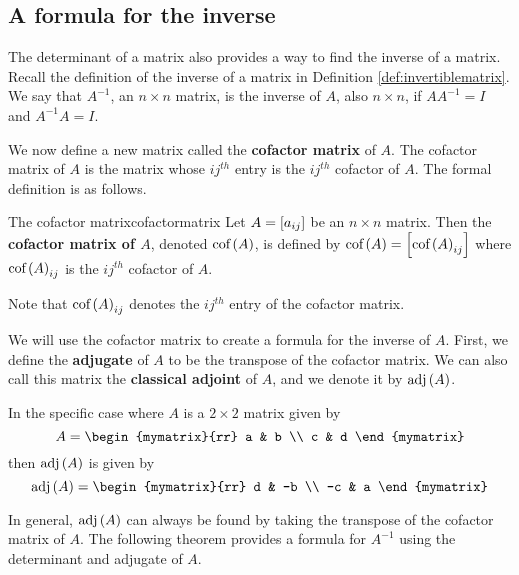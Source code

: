\subsection{A formula for the inverse}

The determinant of a matrix also provides a way to find the inverse of a matrix.
Recall the definition of the inverse of a matrix in Definition \ref{def:invertiblematrix}.
We say that $A^{-1}$, an $n \times n$ matrix, is the inverse of $A$, also $n \times n$, if $AA^{-1} = I$ and $A^{-1}A=I$. 

We now define a new matrix called the \textbf{cofactor matrix} of $A$.  
The cofactor matrix of $A$ is the matrix whose $ij^{th}$ entry is the $ij^{th}$ cofactor of $A$.
The formal definition is as follows.

\begin{definition}{The cofactor matrix}{cofactormatrix}
Let $A=\left[ a_{ij}\right]$ be an $n\times n$ matrix. Then the
\textbf{cofactor matrix of $A$}, denoted 
$\mbox{cof}\left( A\right)$, is defined by $\mbox{cof}\left( A\right) =\left[
\mbox{cof}\left(A\right)_{ij}\right] $ where  $\mbox{cof}\left(A\right)_{ij}$ is the $ij^{th}$ cofactor of $A$.
\end{definition}

Note that $\mbox{cof}\left(A\right)_{ij}$ denotes the $ij^{th}$ entry of the cofactor matrix.

We will use the cofactor matrix to create a formula for the inverse of $A$. First,
we define the \textbf{adjugate} of $A$ to be the transpose of 
the cofactor matrix. We can also call this matrix the \textbf{classical adjoint} of $A$,
and we denote it by $\mbox{adj} \left(A\right)$. 

In the specific case where $A$ is a $2 \times 2$ matrix given by
\begin{equation*}
A = \begin{mymatrix}{rr}
a & b \\
c & d
\end{mymatrix}
\end{equation*}
then $\mbox{adj}\left(A\right)$ is given by
\begin{equation*}
\func{adj}\left(A\right) = 
\begin{mymatrix}{rr}
d & -b \\
-c & a
\end{mymatrix}
\end{equation*}

In general, $\mbox{adj}\left(A\right)$ can always be found by taking the transpose of the cofactor matrix of $A$. The following theorem provides a formula for $A^{-1}$ using the determinant and adjugate of $A$.

